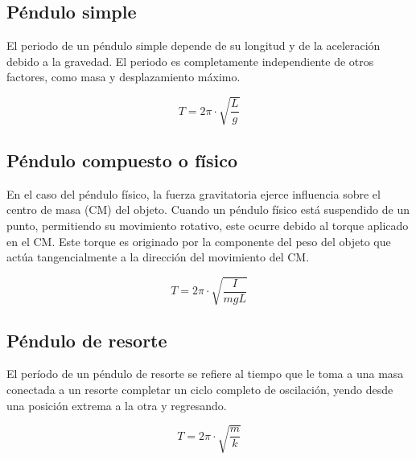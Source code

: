 \documentclass[twocolumn, 12pt]{article}
\begin{document}
\nocite{movimiento-armonico-simple}

\subsection{Péndulo simple}

El periodo de un péndulo simple depende de su longitud y de
la aceleración debido a la gravedad. El periodo es
completamente independiente de otros factores, como masa y
desplazamiento máximo.

{\large
\begin{equation}
    T = 2\pi \cdot \sqrt{\frac{L}{g}}
    \label{eq:periodo_pendulo_simple}
\end{equation}
}

\nocite{tipos-pendulos-1}

\subsection{Péndulo compuesto o físico}

En el caso del péndulo físico, la fuerza gravitatoria
ejerce influencia sobre el centro de masa (CM) del objeto.
Cuando un péndulo físico está suspendido de un punto,
permitiendo su movimiento rotativo, este ocurre debido al
torque aplicado en el CM\@. Este torque es originado por la
componente del peso del objeto que actúa tangencialmente a
la dirección del movimiento del CM\@.

{\large
\begin{equation}
    T = 2\pi \cdot \sqrt{\frac{I}{m g L}}
    \label{eq:periodo_pendulo_fisico}
\end{equation}
}

\nocite{tipos-pendulos-1}

\subsection{Péndulo de resorte}

El período de un péndulo de resorte se refiere al tiempo
que le toma a una masa conectada a un resorte completar un
ciclo completo de oscilación, yendo desde una posición
extrema a la otra y regresando.

    {\large
        \begin{equation}
            T = 2\pi \cdot \sqrt{\frac{m}{k}}
            \label{eq:periodo_pendulo_resorte}
        \end{equation}
    }
\end{document}
